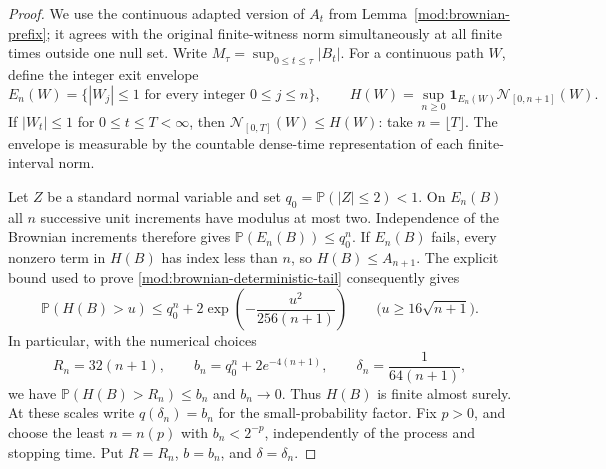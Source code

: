 \documentclass[11pt]{article}
\numberwithin{equation}{section}
\theoremstyle{remark}
\theoremstyle{definition}
\begin{document}
\begin{proof}
We use the continuous adapted version of $A_t$ from
Lemma~\ref{mod:brownian-prefix}; it agrees with the original finite-witness
norm simultaneously at all finite times outside one null set. Write
$M_\tau=\sup_{0\le t\le\tau}|B_t|$.
For a continuous path $W$, define the integer exit envelope
\[
 E_n(W)=\{|W_j|\le1\text{ for every integer }0\le j\le n\},
 \qquad
 H(W)=\sup_{n\ge0}\mathbf1_{E_n(W)}\mathcal N_{[0,n+1]}(W).
\]
If $|W_t|\le1$ for $0\le t\le T<\infty$, then
$\mathcal N_{[0,T]}(W)\le H(W)$: take $n=\lfloor T\rfloor$.
The envelope is measurable by the countable dense-time representation
of each finite-interval norm.

Let $Z$ be a standard normal variable and set
$q_0=\mathbb P(|Z|\le2)<1$. On $E_n(B)$ all $n$ successive unit
increments have modulus at most two. Independence of the Brownian
increments therefore gives $\mathbb P(E_n(B))\le q_0^n$.
If $E_n(B)$ fails, every nonzero term in $H(B)$ has index less
than $n$, so $H(B)\le A_{n+1}$. The explicit bound used to prove
\eqref{mod:brownian-deterministic-tail} consequently gives
\[
 \mathbb P(H(B)>u)
 \le q_0^n+2\exp\!\left(-\frac{u^2}{256(n+1)}\right)
 \qquad\bigl(u\ge16\sqrt{n+1}\bigr).
\]
In particular, with the numerical choices
\[
 R_n=32(n+1),\qquad
 b_n=q_0^n+2e^{-4(n+1)},\qquad
 \delta_n=\frac1{64(n+1)},
\]
we have $\mathbb P(H(B)>R_n)\le b_n$ and $b_n\to0$.
Thus $H(B)$ is finite almost surely. At these scales write
$q(\delta_n)=b_n$ for the small-probability factor. Fix $p>0$, and choose the least
$n=n(p)$ with $b_n<2^{-p}$, independently of the process and
stopping time. Put $R=R_n$, $b=b_n$, and $\delta=\delta_n$.


\end{proof}
\end{document}
